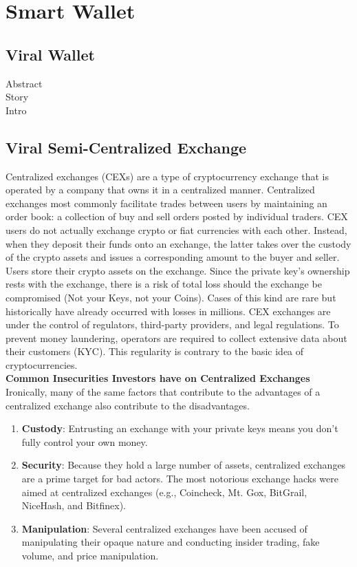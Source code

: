 \documentclass[10pt]{article}
\begin{document}
\section{Smart Wallet}

\subsection{Viral Wallet}

Abstract\\
Story\\
Intro\\


\subsection{Viral Semi-Centralized Exchange}

Centralized exchanges (CEXs) are a type of cryptocurrency exchange that is operated by a company that owns it in a centralized manner. Centralized exchanges most commonly facilitate trades between users by maintaining an order book: a collection of buy and sell orders posted by individual traders. CEX users do not actually exchange crypto or fiat currencies with each other. Instead, when they deposit their funds onto an exchange, the latter takes over the custody of the crypto assets and issues a corresponding amount to the buyer and seller. Users store their crypto assets on the exchange. Since the private key's ownership rests with the exchange, there is a risk of total loss should the exchange be compromised (Not your Keys, not your Coins). Cases of this kind are rare but historically have already occurred with losses in millions. CEX exchanges are under the control of regulators, third-party providers, and legal regulations. To prevent money laundering, operators are required to collect extensive data about their customers (KYC). This regularity is contrary to the basic idea of cryptocurrencies.\\

\textbf{Common Insecurities Investors have on Centralized Exchanges}\\

Ironically, many of the same factors that contribute to the advantages of a centralized exchange also contribute to the disadvantages.
\begin{enumerate}[leftmargin=+0.2in]
\item \textbf{Custody}: Entrusting an exchange with your private keys means you don’t fully control your own money.

\item \textbf{Security}: Because they hold a large number of assets, centralized exchanges are a prime target for bad actors. The most notorious exchange hacks were aimed at centralized exchanges (e.g., Coincheck, Mt. Gox, BitGrail, NiceHash, and Bitfinex).

\item \textbf{Manipulation}: Several centralized exchanges have been accused of manipulating their opaque nature and conducting insider trading, fake volume, and price manipulation.
\end{enumerate}
\end{document}
